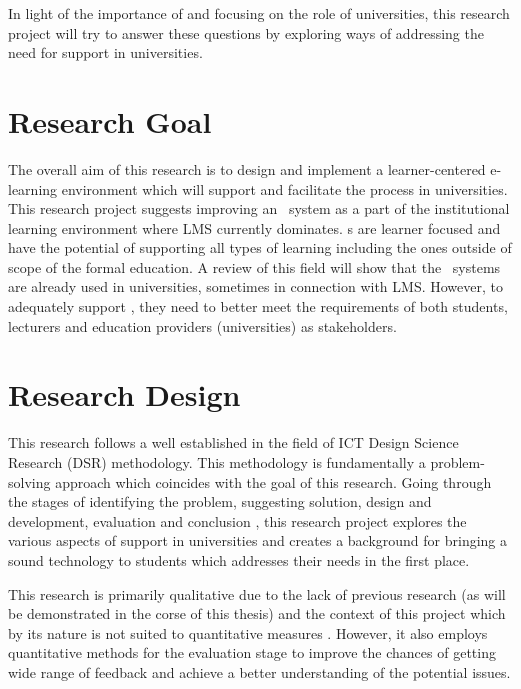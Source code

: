In light of the importance of \LLLs and focusing on the role of universities,
this research project will try to answer these questions by exploring ways
of addressing the need for \LLLs support in universities.

\section{Research Goal}

The overall aim of this research is to design and implement a learner-centered
e-learning environment which will support and facilitate the \LLLs process in
universities. This research project suggests improving an \ep~system as a part
of the institutional learning environment where LMS currently dominates. \ep s
are learner focused and have the potential of supporting all types of learning
including the ones outside of scope of the formal education. A review of this
field will show that the \ep~systems are already used in universities, sometimes
in connection with LMS. However, to adequately support \LLLsn, they need to
better meet the requirements of both students, lecturers and education providers
(universities) as \LLLs stakeholders.

\section{Research Design}

This research follows a well established in the field of ICT Design Science
Research (DSR) methodology. This methodology is fundamentally a problem-solving
approach \citep{Cross1993} which coincides with the goal of this research.
Going through the stages of identifying the problem, suggesting solution,
design and development, evaluation and conclusion
\citep{Peffers2008,Vaishnavi2007}, this research project explores the various
aspects of \LLLs support in universities and creates a background for bringing a
sound technology to students which addresses their needs in the first place.

This research is primarily qualitative due to the lack of previous research (as
will be demonstrated in the corse of this thesis) and the \LLLs context of this
project which by its nature is not suited to quantitative measures
\citep{Creswell2009}. However, it also employs quantitative methods for the 
evaluation stage to improve the chances of getting wide range of feedback and
achieve a better understanding of the potential issues.


